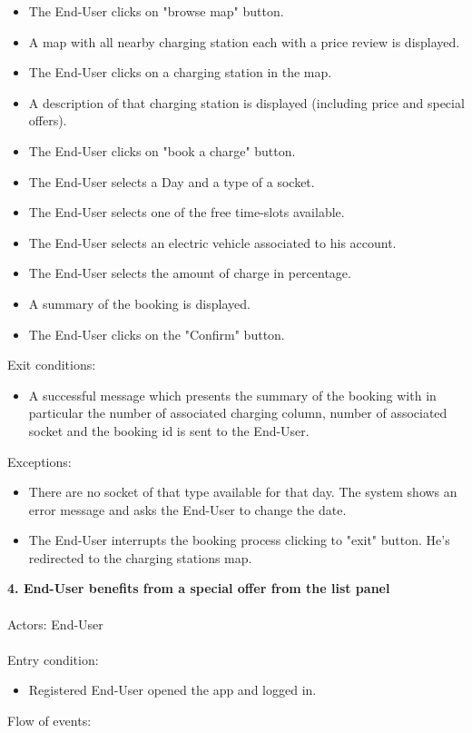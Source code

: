\documentclass[a4paper]{report}
\begin{document}
\begin{itemize}
\item The End-User clicks on "browse map" button.
\item A map with all nearby charging station each with a price review is displayed.
\item The End-User clicks on a charging station in the map.
\item A description of that charging station is displayed (including price and special offers).
\item The End-User clicks on "book a charge" button.
\item The End-User selects a Day and a type of a socket.
\item The End-User selects one of the free time-slots available.
\item The End-User selects an electric vehicle associated to his account.
\item The End-User selects the amount of charge in percentage.
\item A summary of the booking is displayed.
\item The End-User clicks on the "Confirm" button.
\end{itemize}
Exit conditions:
\begin{itemize}
\item A successful message which presents the summary of the booking with in particular the number of associated charging column, number of associated socket and the booking id is sent to the End-User.
 \end{itemize}
Exceptions:
 \begin{itemize}
 \item There are no socket of that type available for that day. The system shows an error message and asks the End-User to change the date.
 \item The End-User interrupts the booking process clicking to "exit" button. He's redirected to the charging stations map.
\end{itemize}
\textbf{4. End-User benefits from a special offer from the list panel}\label{uc:5}
\\ \\
Actors: End-User \\ \\
Entry condition:
\begin{itemize}
\item Registered End-User opened the app and logged in.
\end{itemize}
Flow of events:
\end{document}
